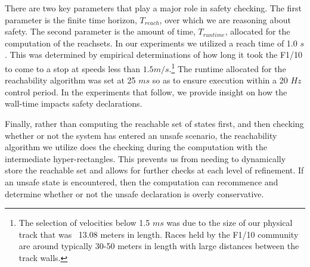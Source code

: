 \documentclass[manuscript,screen,review]{acmart}
\begin{document}
There are two key parameters that play a major role in safety checking. The first parameter is the finite time horizon, $T_{reach}$, over which we are reasoning about safety. The second parameter is the amount of time, $T_{runtime}$, allocated for the computation of the reachsets. In our experiments we utilized a reach time of 1.0 $s$. This was determined by empirical determinations of how long it took the F1/10 to come to a stop at speeds less than $1.5 m/s.$\footnote{The selection of velocities below 1.5 $ms$ was due to the size of our physical track that was ~13.08 meters in length. Races held by the F1/10 community are around typically 30-50 meters in length with large distances between the track walls.} The runtime allocated for the reachability algorithm was set at 25 $ms$ so as to ensure execution within a 20 $Hz$ control period. In the experiments that follow, we provide insight on how the wall-time impacts safety declarations. 

Finally, rather than computing the reachable set of states first, and then checking whether or not the system has entered an unsafe scenario, the reachability algorithm we utilize does the checking during the computation with the intermediate hyper-rectangles. This prevents us from needing to dynamically store the reachable set and allows for further checks at each level of refinement. If an unsafe state is encountered, then the computation can recommence and determine whether or not the unsafe declaration is overly conservative.


%
%
\end{document}
